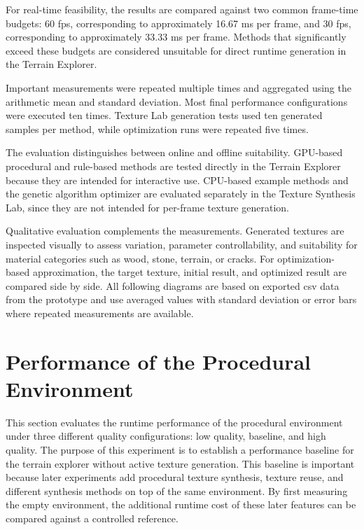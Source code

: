 For real-time feasibility, the results are compared against two common frame-time budgets: 60 \gls{fps}, corresponding to approximately 16.67 ms per frame, and 30 \gls{fps}, corresponding to approximately 33.33 ms per frame. Methods that significantly exceed these budgets are considered unsuitable for direct runtime generation in the Terrain Explorer.

Important measurements were repeated multiple times and aggregated using the arithmetic mean and standard deviation. Most final performance configurations were executed ten times. Texture Lab generation tests used ten generated samples per method, while optimization runs were repeated five times.

The evaluation distinguishes between online and offline suitability. GPU-based procedural and rule-based methods are tested directly in the Terrain Explorer because they are intended for interactive use. CPU-based example methods and the genetic algorithm optimizer are evaluated separately in the Texture Synthesis Lab, since they are not intended for per-frame texture generation.

Qualitative evaluation complements the measurements. Generated textures are inspected visually to assess variation, parameter controllability, and suitability for material categories such as wood, stone, terrain, or cracks. For optimization-based approximation, the target texture, initial result, and optimized result are compared side by side. All following diagrams are based on exported \gls{csv} data from the prototype and use averaged values with standard deviation or error bars where repeated measurements are available.

\section{Performance of the Procedural Environment}
\label{sec:performance_procedural_environment}

This section evaluates the runtime performance of the procedural environment under three different quality configurations: low quality, baseline, and high quality. The purpose of this experiment is to establish a performance baseline for the terrain explorer without active texture generation. This baseline is important because later experiments add procedural texture synthesis, texture reuse, and different synthesis methods on top of the same environment. By first measuring the empty environment, the additional runtime cost of these later features can be compared against a controlled reference.

